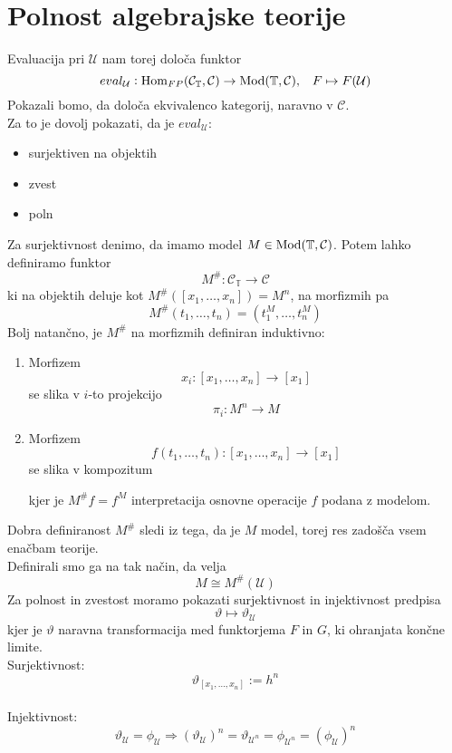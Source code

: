 \section{Polnost algebrajske teorije}
%
Evaluacija pri $\mathcal{U}$ nam torej določa funktor
$$eval_\mathcal{U} : \operatorname{Hom}_{FP}(\mathcal{C}_\mathbb{T}, \mathcal{C}) \to \operatorname{Mod}(\mathbb{T}, \mathcal{C}) \text{,} \quad F \mapsto F(\mathcal{U})$$
%
Pokazali bomo, da določa ekvivalenco kategorij, naravno v $\mathcal{C}$.\\
Za to je dovolj pokazati, da je $eval_\mathcal{U}$:
\begin{itemize}
\item surjektiven na objektih
\item zvest
\item poln
\end{itemize}
Za surjektivnost denimo, da imamo model $M \in \operatorname{Mod}(\mathbb{T}, \mathcal{C})$. Potem lahko definiramo funktor 
$$M^{\#} : \mathcal{C}_\mathbb{T} \to \mathcal{C}$$
ki na objektih deluje kot $M^{\#}([x_1, \ldots, x_n]) = M^n$, na morfizmih pa
$$M^{\#}(t_1, \ldots, t_n) = (t_1^M, \ldots, t_n^M)$$
%
%
Bolj natančno, je $M^{\#}$ na morfizmih definiran induktivno:
\begin{enumerate}
\item Morfizem $$x_i : [x_1, \ldots, x_n] \to [x_1]$$ se slika v $i$-to projekcijo $$\pi_i : M^n \to M$$
\item Morfizem $$f(t_1, \ldots, t_n) : [x_1, \ldots, x_n] \to [x_1]$$ se slika v kompozitum
\begin{center}
\end{center}
kjer je $M^{\#}f = f^M$ interpretacija osnovne operacije $f$ podana z modelom.
\end{enumerate}
%
Dobra definiranost $M^{\#}$ sledi iz tega, da je $M$ model, torej res zadošča vsem enačbam teorije.\\
Definirali smo ga na tak način, da velja
$$M \cong M^{\#}(\mathcal{U})$$
%
Za polnost in zvestost moramo pokazati surjektivnost in injektivnost predpisa $$\vartheta \mapsto \vartheta_\mathcal{U}$$
kjer je $\vartheta$ naravna transformacija med funktorjema $F$ in $G$, ki ohranjata končne limite.\\
Surjektivnost: $$\vartheta_{[x_1, \ldots, x_n]} := h^n$$\\
Injektivnost: $$\vartheta_\mathcal{U} = \phi_\mathcal{U} \Rightarrow (\vartheta_\mathcal{U})^n = \vartheta_{\mathcal{U}^n} = \phi_{\mathcal{U}^n} = (\phi_\mathcal{U})^n$$
